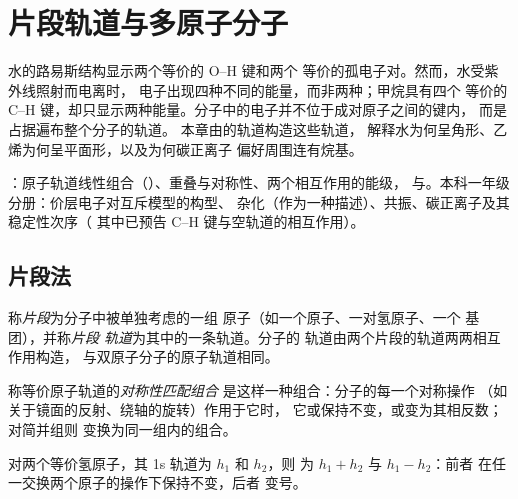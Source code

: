 \chapter{片段轨道与多原子分子}\label{ch:b2:fragment-orbitals}

水的路易斯结构显示两个等价的 O--H 键和两个
等价的孤电子对。然而，水受紫外线照射而电离时，
电子出现四种不同的能量，而非两种；甲烷具有四个
等价的 C--H 键，却只显示两种能量。分子中的电子并不位于成对原子之间的键内，
而是占据遍布整个分子的轨道。
本章由的轨道构造这些轨道，
解释水为何呈角形、乙烯为何呈平面形，以及为何碳正离子
偏好周围连有烷基。

\begin{recall}
：原子轨道线性组合（）、重叠与对称性、两个相互作用的能级，
与。本科一年级分册：价层电子对互斥模型的构型、
杂化（作为一种描述）、共振、碳正离子及其稳定性次序（
其中已预告 C--H 键与空轨道的相互作用）。
\end{recall}

\section{片段法}

\begin{definition}[片段]\label{def:b2:fragment-orbitals:fragment}
称\emph{片段}为分子中被单独考虑的一组
原子（如一个原子、一对氢原子、一个  基团），并称\emph{片段
轨道}为其中的一条轨道。分子的
轨道由两个片段的轨道两两相互作用构造，
与双原子分子的原子轨道相同。
\end{definition}

\begin{definition}[对称性匹配组合]\label{def:b2:fragment-orbitals:symmetry-adapted}
称等价原子轨道的\emph{对称性匹配组合}
是这样一种组合：分子的每一个对称操作
（如关于镜面的反射、绕轴的旋转）作用于它时，
它或保持不变，或变为其相反数；对简并组则
变换为同一组内的组合。
\end{definition}

\begin{proposition}[两个氢原子]\label{prop:b2:fragment-orbitals:h2-pair}
对两个等价氢原子，其 1s 轨道为 $h_1$ 和 $h_2$，则
为 $h_1 + h_2$ 与 $h_1 - h_2$：前者
在任一交换两个原子的操作下保持不变，后者
变号。
\end{proposition}

